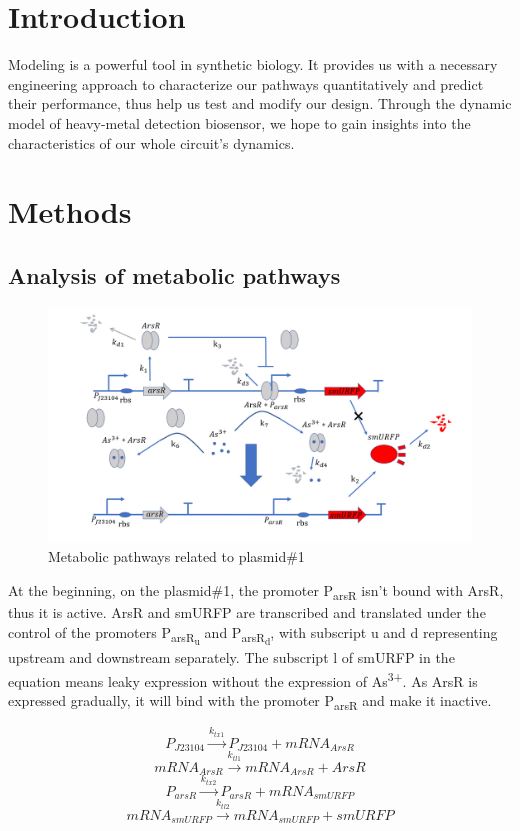 \section{Introduction}
Modeling is a powerful tool in synthetic biology. It provides us with a necessary engineering approach to characterize our pathways quantitatively and predict their performance, thus help us test and modify our design. Through the dynamic model of heavy-metal detection biosensor, we hope to gain insights into the characteristics of our whole circuit's dynamics.

\section{Methods}
\subsection{Analysis of metabolic pathways}
\begin{figure}[h]
	\centering
	\includegraphics[width=12cm]{1}
	\caption{Metabolic pathways related to plasmid\#1}
\end{figure}

At the beginning, on the plasmid\#1, the promoter P\textsubscript{arsR} isn't bound with ArsR, thus it is active. ArsR and smURFP are transcribed and translated under the control of the promoters P\textsubscript{arsR\textsubscript{u}} and P\textsubscript{arsR\textsubscript{d}}, with subscript u and d representing upstream and downstream separately. The subscript l of smURFP in the equation means leaky expression without the expression of As\textsuperscript{3+}. As ArsR is expressed gradually, it will bind with the promoter P\textsubscript{arsR} and make it inactive. \cite{pola2018novel}

\begin{equation}
	P_{J23104} \stackrel{k_{tx1}}{\longrightarrow} P_{J23104}+mRNA_{ArsR}
\end{equation}
\begin{equation}
	mRNA_{ArsR}\stackrel{k_{tl1}}{\longrightarrow} mRNA_{ArsR}+ArsR
\end{equation}
\begin{equation}
	P_{arsR} \stackrel{k_{tx2}}{\longrightarrow} P_{arsR} +mRNA_{smURFP}
\end{equation}
\begin{equation}
	mRNA_{smURFP} \stackrel{k_{tl2}}{\longrightarrow} mRNA_{smURFP}+ smURFP
\end{equation}

